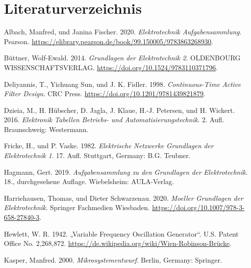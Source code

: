 \documentclass[
  ngerman,
  letterpaper,
]{scrbook}
\newlength{\cslhangindent}
\newenvironment{CSLReferences}[2] %
 {\begin{list}{}{%
  \setlength{\itemindent}{0pt}
  \setlength{\leftmargin}{0pt}
  \setlength{\parsep}{0pt}
  \ifodd #1
   \setlength{\leftmargin}{\cslhangindent}
   \setlength{\itemindent}{-1\cslhangindent}
  \fi
  \setlength{\itemsep}{#2\baselineskip}}}
 {\end{list}}
\begin{document}

\chapter*{Literaturverzeichnis}\label{literaturverzeichnis}


\label{refs}
\begin{CSLReferences}{1}{0}
Albach, Manfred, und Janina Fischer. 2020. \emph{Elektrotechnik
Aufgabensammlung}. Pearson.
\url{https://elibrary.pearson.de/book/99.150005/9783863268930}.

Büttner, Wolf-Ewald. 2014. \emph{Grundlagen der Elektrotechnik 2}.
{OLDENBOURG} {WISSENSCHAFTSVERLAG}.
\url{https://doi.org/10.1524/9783110371796}.

Deliyannis, T., Yichuang Sun, und J. K. Fidler. 1998.
\emph{Continuous-Time Active Filter Design}. CRC Press.
\url{https://doi.org/10.1201/9781439821879}.

Dzieia, M., H. Hübscher, D. Jagla, J. Klaue, H.-J. Petersen, und H.
Wickert. 2016. \emph{Elektronik Tabellen Betriebs- und
Automatisierungstechnik}. 2. Aufl. Braunschweig: Westermann.

Fricke, H., und P. Vaske. 1982. \emph{Elektrische Netzwerke Grundlagen
der Elektrotechnik 1}. 17. Aufl. Stuttgart, Germany: B.G. Teubner.

Hagmann, Gert. 2019. \emph{Aufgabensammlung zu den Grundlagen der
Elektrotechnik}. 18., durchgesehene Auflage. Wiebelsheim: AULA-Verlag.

Harriehausen, Thomas, und Dieter Schwarzenau. 2020. \emph{Moeller
Grundlagen der Elektrotechnik}. Springer Fachmedien Wiesbaden.
\url{https://doi.org/10.1007/978-3-658-27840-3}.

Hewlett, W. R. 1942. {„Variable Frequency Oscillation Generator``}. U.S.
Patent Office No. 2,268,872.
\url{https://de.wikipedia.org/wiki/Wien-Robinson-Brücke}.

Kasper, Manfred. 2000. \emph{Mikrosystementwurf}. Berlin, Germany:
Springer.


\end{CSLReferences}
\end{document}

